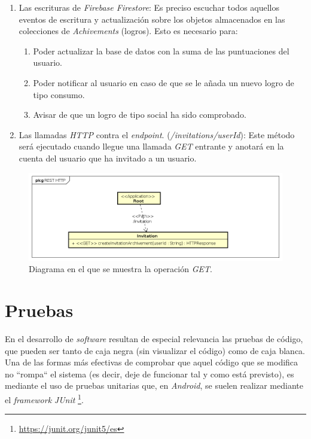 \documentclass[twoside]{report}
\begin{document}
\begin{enumerate}
\item Las escrituras de \textit{Firebase Firestore}: Es preciso escuchar todos aquellos eventos de escritura y actualización sobre los objetos almacenados en las colecciones de \textit{Achivements} (logros). Esto es necesario para:
	\begin{enumerate}
		\item Poder actualizar la base de datos con la suma de las puntuaciones del usuario.
		\item Poder notificar al usuario en caso de que se le añada un nuevo logro de tipo consumo.
		\item Avisar de que un logro de tipo social ha sido comprobado.
	\end{enumerate}

\item Las llamadas \textit{HTTP} contra el \textit{endpoint}. (\textit{/invitations/{userId}}): Este método será ejecutado cuando llegue una llamada \textit{GET} entrante y anotará en la cuenta del usuario que ha invitado a un usuario.
\end{enumerate}


\begin{figure}[H]
\centering
\includegraphics[width=\textwidth]{images/restAPI}
\caption{Diagrama en el que se muestra la operación \textit{GET}.}
\end{figure}

\section{Pruebas}


En el desarrollo de \textit{software} resultan de especial relevancia las pruebas de código, que pueden ser tanto de caja negra (sin visualizar el código) como de caja blanca. Una de las formas más efectivas de comprobar que aquel código que se modifica no “rompa“ el sistema (es decir, deje de funcionar tal y como está previsto), es mediante el uso de pruebas unitarias que, en \textit{Android}, se suelen realizar mediante el \textit{framework} \textit{JUnit} \footnote{\url{https://junit.org/junit5/es}}. 
\end{document}

